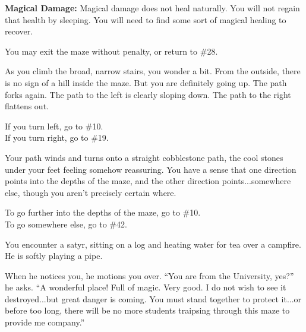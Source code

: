 \documentclass[white]{gl2018}
\begin{document}
\begin{large}
\begin{location}{22}
{\bf Magical Damage:} Magical damage does not heal naturally. You will not regain that health by sleeping. You will need to find some sort of magical healing to recover.
\begin{fromhere}
You may exit the maze without penalty, or return to \#28.
\end{fromhere}
\end{location}
\begin{location}{23}
As you climb the broad, narrow stairs, you wonder a bit. From the outside, there is no sign of a hill inside the maze. But you are definitely going up. The path forks again. The path to the left is clearly sloping down. The path to the right flattens out.
\begin{fromhere} If you turn left, go to \#10.\\ If you turn right,  go to \#19.\end{fromhere}
\end{location}
\begin{location}{24}
Your path winds and turns onto a straight cobblestone path, the cool stones under your feet feeling somehow reassuring.  You have a sense that one direction points into the depths of the maze, and the other direction points...somewhere else, though you aren't precisely certain where.  
\begin{fromhere}To go further into the depths of the maze, go to \#10.\\  To go somewhere else, go to \#42.\end{fromhere}
\end{location}
\begin{location}{25}
You encounter a satyr, sitting on a log and heating water for tea over a campfire. He is softly playing a pipe.

When he notices you, he motions you over.  ``You are from the University, yes?'' he asks.  ``A wonderful place!  Full of magic.  Very good.  I do not wish to see it destroyed...but great danger is coming.  You must stand together to protect it...or before too long, there will be no more students traipsing through this maze to provide me company.''


\end{location}
\end{large}
\end{document}
